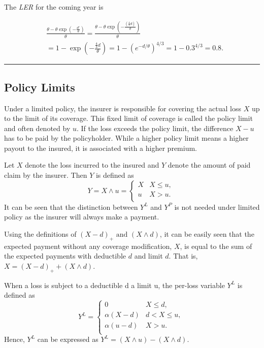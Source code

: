 \documentclass[]{book}
\theoremstyle{definition}
\theoremstyle{definition}
\theoremstyle{definition}
\theoremstyle{remark}
\begin{document}
The \emph{LER} for the coming year is

\begin{align*}
&\frac{\theta - \theta \exp(- \frac{d'}{\theta})}{\theta}=\frac{\theta - \theta \exp(- \frac{\left( \frac{4}{3}d \right)}{\theta})}{\theta} \\
&= 1 - \exp\left(- \frac{ \frac{4}{3} d }{\theta}\right) = 1 - \left( e^{-d /\theta} \right)^{4/3} = 1 - {0.3}^{4/3} = 0.8 .
\end{align*}

\begin{center}\rule{0.5\linewidth}{\linethickness}\end{center}

\subsection{Policy Limits}\label{S:PolicyLimits}

Under a limited policy, the insurer is responsible for covering the
actual loss \(X\) up to the limit of its coverage. This fixed limit of
coverage is called the policy limit and often denoted by \(u\). If the
loss exceeds the policy limit, the difference \(X - u\) has to be paid
by the policyholder. While a higher policy limit means a higher payout
to the insured, it is associated with a higher premium.

Let \(X\) denote the loss incurred to the insured and \(Y\) denote the
amount of paid claim by the insurer. Then \(Y\) is defined as
\[Y = X \land u = \left\{ \begin{matrix}
X & X \leq u, \\
u & X > u. \\
\end{matrix} \right.\ \] It can be seen that the distinction between
\(Y^{L}\) and \(Y^{P}\) is not needed under limited policy as the
insurer will always make a payment.

Using the definitions of
\(\left(X-d\right)_+ \text{ and } \left(X\land d\right)\), it can be
easily seen that the expected payment without any coverage modification,
\(X\), is equal to the sum of the expected payments with deductible
\(d\) and limit \(d\). That is,
\({X=\left(X-d\right)}_++ \left(X\land d\right)\).

When a loss is subject to a deductible d a limit u, the per-loss
variable \(Y^L\) is defined as \[Y^{L} = \left\{ \begin{matrix}
0 & X \leq d, \\
\alpha\left( X - d \right) & d <  X \leq u, \\
\alpha\left( u - d \right) & X > u. \\
\end{matrix} \right.\ \] Hence, \(Y^L\) can be expressed as
\(Y^L=\left(X\land u\right)-\left(X\land d\right)\).
\end{document}
